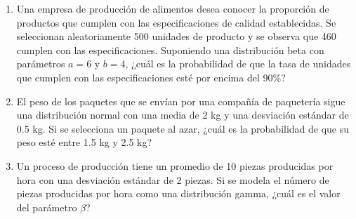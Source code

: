 \begin{Ejer}
\begin{enumerate}
    \item Una empresa de producción de alimentos desea conocer la proporción de productos que cumplen con las especificaciones de calidad establecidas. Se seleccionan aleatoriamente 500 unidades de producto y se observa que 460 cumplen con las especificaciones. Suponiendo una distribución beta con parámetros $a=6$ y $b=4$, ¿cuál es la probabilidad de que la tasa de unidades que cumplen con las especificaciones esté por encima del 90\%?    

    \item El peso de los paquetes que se envían por una compañía de paquetería sigue una distribución normal con una media de 2 kg y una desviación estándar de 0.5 kg. Si se selecciona un paquete al azar, ¿cuál es la probabilidad de que su peso esté entre 1.5 kg y 2.5 kg?

    \item Un proceso de producción tiene un promedio de 10 piezas producidas por hora con una desviación estándar de 2 piezas. Si se modela el número de piezas producidas por hora como una distribución gamma, ¿cuál es el valor del parámetro $\beta$?

\end{enumerate}
\end{Ejer} 



